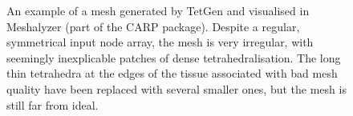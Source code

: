   \begin{figure}[htbp]
    \centering
    \caption{An example of a mesh generated by TetGen and visualised in Meshalyzer (part of the CARP package). Despite a regular, symmetrical input node array, the mesh is very irregular, with seemingly inexplicable patches of dense tetrahedralisation. The long thin tetrahedra at the edges of the tissue associated with bad mesh quality have been replaced with several smaller ones, but the mesh is still far from ideal.}
    \label{fig:tetgen}
  \end{figure}
  
